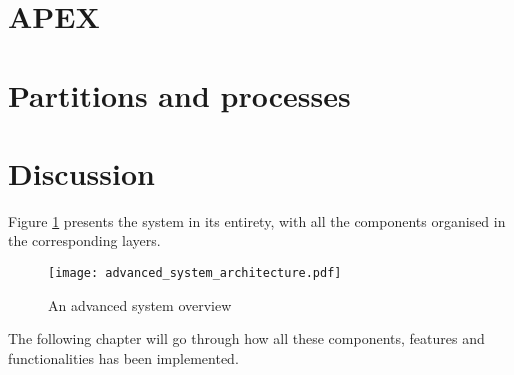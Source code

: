 \section{APEX}

\section{Partitions and processes}

\section{Discussion}

Figure \ref{fig:advanced_system} presents the system in its entirety,
with all the components organised in the corresponding layers.

\begin{figure}[H]
\centering
\texttt{[image: advanced\_system\_architecture.pdf]}
\caption{An advanced system overview}
\label{fig:advanced_system}
\end{figure}

The following chapter will go through how all these components,
features and functionalities has been implemented.